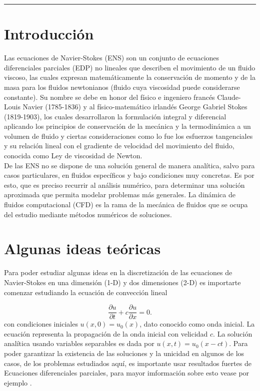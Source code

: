 \documentclass[A4,10pt]{article}
\begin{document}
\begin{center}\rule{0.9\textwidth}{0.1mm}
 \end{center}
\begin{multicols}{2}


\section{Introducción}

Las ecuaciones de Navier-Stokes (ENS) son un conjunto de ecuaciones diferenciales parciales (EDP) no lineales que describen el movimiento de un fluido viscoso, las cuales expresan matemáticamente la conservación de momento  y de la masa para los fluidos newtonianos (fluido cuya viscosidad puede considerarse constante)\cite{Achenson}.  Su nombre se debe en honor del físico e ingeniero francés Claude-Louis Navier (1785-1836) y al físico-matemático irlandés George Gabriel Stokes (1819-1903), los cuales desarrollaron la formulación integral y diferencial aplicando los principios de conservación de la mecánica y la termodinámica a un volumen de fluido y ciertas consideraciones como lo fue los esfuerzos tangenciales y su relación lineal con el gradiente de velocidad del movimiento del fluido, conocida como Ley de viscosidad de Newton\cite{Achenson}.\\


De las ENS no se dispone de una solución general de manera analítica, salvo para casos particulares, en fluidos específicos y bajo condiciones muy concretas\cite{Girault,Achenson}. Es por esto, que es preciso recurrir al análisis numérico, para determinar una solución aproximada que permita modelar problemas más generales. La dinámica de fluidos computacional (CFD) es la rama de la mecánica de fluidos que se ocupa del estudio mediante métodos numéricos de soluciones\cite{Barbagroup,Girault}.

\section{Algunas ideas teóricas}

Para poder estudiar algunas ideas en la discretización de las ecuaciones de Navier-Stokes en una dimensión (1-D) y dos dimensiones (2-D) es importarte comenzar estudiando la ecuación de convección lineal

$$\frac{\partial u}{\partial t} + c \frac{\partial u}{\partial x} = 0.$$
con condiciones iniciales $u(x,0)=u_0(x)$, dato conocido como onda inicial. La ecuación representa la propagación de la onda inicial con velicidad $c$. La solución analítica usando variables separables es dada por $u(x,t)=u_0(x-ct)$. Para poder garantizar la existencia de las soluciones y la unicidad en algunos de los casos, de los problemas estudiados aquí, es importante usar resultados fuertes de Ecuaciones diferenciales parciales, para mayor imformación sobre esto vease por ejemplo \cite{Girault}.


\end{multicols}
\end{document}
